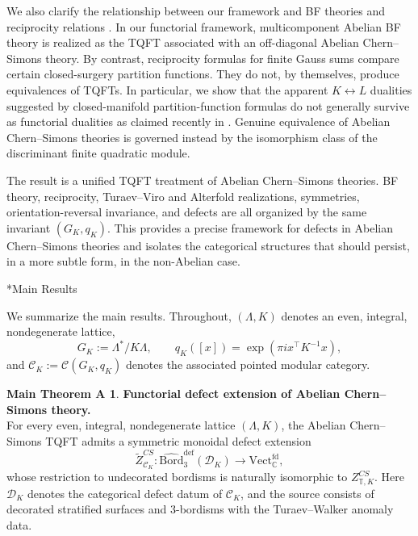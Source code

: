 \documentclass[12pt]{amsart}
\makeatletter
\renewcommand\subsection{\@startsection{subsection}{2}%
  \z@{.5\linespacing\@plus.7\linespacing}{-.5em}%
  {\normalfont\bfseries}}
\numberwithin{equation}{section}
\theoremstyle{definition}
\newtheorem*{theoremA}{Main Theorem A}
\makeatother
\begin{document}
We also clarify the relationship between our framework and BF theories \cite{Horowitz89,BlauThompson91,BBRT91} and reciprocity relations \cite{Murakami,Mattes,Deloup1999,Deloup2005}.  In our functorial framework, multicomponent Abelian BF theory is realized as the TQFT associated with an off-diagonal Abelian Chern--Simons theory.  By contrast, reciprocity formulas for finite Gauss sums compare certain closed-surgery partition functions.  They do not, by themselves, produce equivalences of TQFTs.  In particular, we show that the apparent $K\leftrightarrow L$ dualities suggested by closed-manifold partition-function formulas do not generally survive as functorial dualities as claimed recently in \cite{Kim2024,Tagaris2025}.  Genuine equivalence of Abelian Chern--Simons theories is governed instead by the isomorphism class of the discriminant finite quadratic module.


The result is a unified TQFT treatment of Abelian Chern--Simons theories.  BF theory, reciprocity, Turaev--Viro and Alterfold realizations, symmetries, orientation-reversal invariance, and defects are all organized by the same invariant $(G_K,q_K)$.  This provides a precise framework for defects in Abelian Chern--Simons theories and isolates the categorical structures that should persist, in a more subtle form, in the non-Abelian case.

\subsection*{Main Results}

We summarize the main results. Throughout,
$(\Lambda,K)$ denotes an even, integral, nondegenerate lattice,
$$
G_K:=\Lambda^*/K\Lambda,
\qquad
q_K([x])=\exp(\pi i x^\top K^{-1}x),
$$
and $
\mathcal C_K:=\mathcal C(G_K,q_K)
$ denotes the associated pointed modular category.

\begin{theoremA}
\textbf{Functorial defect extension of Abelian Chern--Simons theory.}
\leavevmode\\

For every even, integral, nondegenerate lattice $(\Lambda,K)$,
the Abelian Chern--Simons TQFT admits a symmetric monoidal defect
extension
$$
\widetilde Z^{CS}_{\mathcal C_K}:
\widehat{\mathrm{Bord}}^{\mathrm{def}}_3(\mathcal D_K)
\longrightarrow
\mathrm{Vect}^{\mathrm{fd}}_{\mathbb C},
$$
whose restriction to undecorated bordisms is naturally isomorphic
to $Z^{CS}_{\mathbb T,K}$. Here $\mathcal D_K$ denotes the
categorical defect datum of $\mathcal C_K$, and the source consists
of decorated stratified surfaces and $3$-bordisms with the
Turaev--Walker anomaly data.
\end{theoremA}
\end{document}
